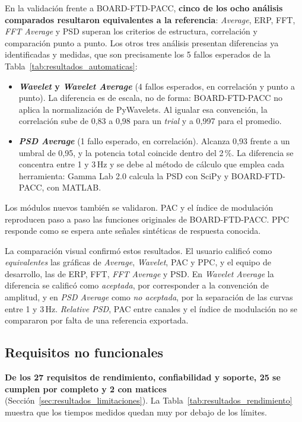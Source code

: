 \documentclass[12pt,letterpaper,oneside]{article}
\begin{document}
En la validación frente a BOARD-FTD-PACC, \textbf{cinco de los ocho análisis comparados resultaron equivalentes a la referencia}: \textit{Average}, ERP, FFT, \textit{FFT Average} y PSD superan los criterios de estructura, correlación y comparación punto a punto. Los otros tres análisis presentan diferencias ya identificadas y medidas, que son precisamente los 5 fallos esperados de la Tabla~\ref{tab:resultados_automaticas}:

\begin{itemize}
  \item \textbf{\textit{Wavelet} y \textit{Wavelet Average}} (4 fallos esperados, en correlación y punto a punto). La diferencia es de escala, no de forma: BOARD-FTD-PACC no aplica la normalización de PyWavelets. Al igualar esa convención, la correlación sube de 0,83 a 0,98 para un \textit{trial} y a 0,997 para el promedio.
  \item \textbf{\textit{PSD Average}} (1 fallo esperado, en correlación). Alcanza 0,93 frente a un umbral de 0,95, y la potencia total coincide dentro del 2\,\%. La diferencia se concentra entre 1 y 3\,Hz y se debe al método de cálculo que emplea cada herramienta: Gamma Lab 2.0 calcula la PSD con SciPy y BOARD-FTD-PACC, con MATLAB.
\end{itemize}

Los módulos nuevos también se validaron. PAC y el índice de modulación reproducen paso a paso las funciones originales de BOARD-FTD-PACC. PPC responde como se espera ante señales sintéticas de respuesta conocida.

La comparación visual confirmó estos resultados. El usuario calificó como \textit{equivalentes} las gráficas de \textit{Average}, \textit{Wavelet}, PAC y PPC, y el equipo de desarrollo, las de ERP, FFT, \textit{FFT Average} y PSD. En \textit{Wavelet Average} la diferencia se calificó como \textit{aceptada}, por corresponder a la convención de amplitud, y en \textit{PSD Average} como \textit{no aceptada}, por la separación de las curvas entre 1 y 3\,Hz. \textit{Relative PSD}, PAC entre canales y el índice de modulación no se compararon por falta de una referencia exportada.

\subsection{Requisitos no funcionales}

\textbf{De los 27 requisitos de rendimiento, confiabilidad y soporte, 25 se cumplen por completo y 2 con matices} (Sección~\ref{sec:resultados_limitaciones}). La Tabla~\ref{tab:resultados_rendimiento} muestra que los tiempos medidos quedan muy por debajo de los límites.
\end{document}
